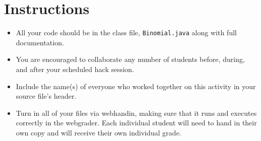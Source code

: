 \documentclass[12pt]{scrartcl}
\begin{document}
\section*{Instructions}

\begin{itemize}

  \item All your code should be in the class file, 
  \texttt{Binomial.java} along with full documentation.

  \item You are encouraged to collaborate any number of students 
  before, during, and after your scheduled hack session.  

  \item Include the name(s) of everyone who worked together on
  this activity in your source file's header.

  \item Turn in all of your files via webhandin, making sure that 
  it runs and executes correctly in the webgrader.  Each individual 
  student will need to hand in their own copy and will receive 
  their own individual grade.
\end{itemize}  
\end{document}
